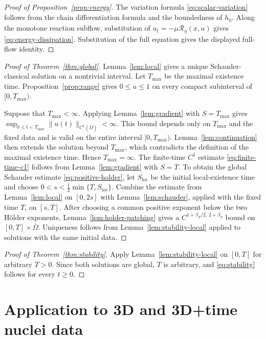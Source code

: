 \documentclass[11pt]{article}
\theoremstyle{remark}
\newcommand{\cT}{\mathcal{R}}
\begin{document}
\begin{proof}[Proof of Proposition~\ref{prop:energy}]
The variation formula \eqref{eq:scalar-variation} follows from the chain differentiation formula and the boundedness of $h_\eta$.  Along the monotone reaction subflow, substitution of $u_t=-\mu\cT_\eta(x,u)$ gives \eqref{eq:energy-dissipation}.  Substitution of the full equation gives the displayed full-flow identity.
\end{proof}

\begin{proof}[Proof of Theorem~\ref{thm:global}]
Lemma~\ref{lem:local} gives a unique Schauder-classical solution on a
nontrivial interval. Let $T_{\max}$ be the maximal existence time.
Proposition~\ref{prop:range} gives
$0\leq u\leq 1$
on every compact subinterval of $[0,T_{\max})$.

Suppose that
$T_{\max}<\infty$. Applying Lemma~\ref{lem:gradient} with
$S=T_{\max}
$ gives
$\sup_{0\leq t<T_{\max}}
\|u(t)\|_{C^1(\overline{\Omega})}
<\infty$. This bound depends only on $T_{\max}$ and the fixed data and is valid on
the entire interval $[0,T_{\max})$. Lemma~\ref{lem:continuation} then
extends the solution beyond $T_{\max}$, which contradicts the definition
of the maximal existence time. Hence
$T_{\max}=\infty$. The finite-time $C^1$ estimate \eqref{eq:finite-time-c1} follows from
Lemma~\ref{lem:gradient} with
$S=T$. To obtain the global Schauder estimate \eqref{eq:positive-holder}, let
$S_{\mathrm{loc}}$ be the initial local-existence time and choose
$0<s<\frac12\min\{T,S_{\mathrm{loc}}\}$. Combine the estimate from Lemma~\ref{lem:local} on
$[0,2s]$ with Lemma~\ref{lem:schauder}, applied with the fixed time $T$, on $[s,T]$. After choosing a common positive exponent below the two H\"older
exponents, Lemma~\ref{lem:holder-patching} gives a $C^{1+\beta_T/2,\,2+\beta_T}$ bound on $[0,T]\times\overline{\Omega}$. Uniqueness follows from Lemma~\ref{lem:stability-local} applied to
solutions with the same initial data.
\end{proof}

\begin{proof}[Proof of Theorem~\ref{thm:stability}]
Apply Lemma~\ref{lem:stability-local} on $[0,T]$ for arbitrary $T>0$.  Since both solutions are global, $T$ is arbitrary, and \eqref{eq:stability} follows for every $t\ge0$.
\end{proof}


\section{Application to 3D and 3D+time nuclei data}
\label{sec:interpretation}
\end{document}
